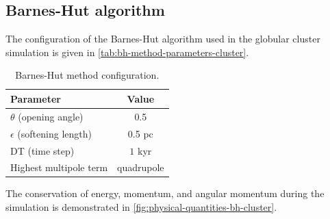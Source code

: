 \subsection{Barnes-Hut algorithm}
The configuration of the Barnes-Hut algorithm used in the globular cluster simulation is given in \autoref{tab:bh-method-parameters-cluster}.
\begin{table}[htp]
    \centering
    \begin{tabular}{|l|c|}
        \hline
        \textbf{Parameter}            & \textbf{Value} \\
        \hline
        $\theta$ (opening angle)      & 0.5            \\
        $\epsilon$ (softening length) & 0.5 pc         \\
        DT (time step)                & $1$ kyr        \\
        Highest multipole term        & quadrupole     \\
        \hline
    \end{tabular}
    \caption{Barnes-Hut method configuration.}
    \label{tab:bh-method-parameters-cluster}
\end{table}
The conservation of energy, momentum, and angular momentum during the simulation is demonstrated in \autoref{fig:physical-quantities-bh-cluster}.
